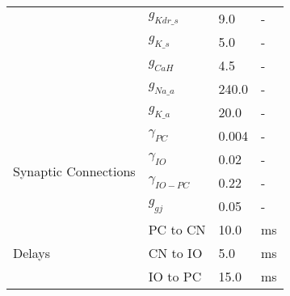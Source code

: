 \begin{table}[h]
\begin{tabular}{llll}
 & $g_{Kdr\_s}$ & 9.0 & - \\
 & $g_{K\_s}$ & 5.0 & - \\
 & $g_{CaH}$ & 4.5 & - \\
 & $g_{Na\_a}$ & 240.0 & - \\
 & $g_{K\_a}$ & 20.0 & - \\
\hline
\multirow{4}{*}{Synaptic Connections} & $\gamma_{PC}$ & 0.004 & - \\
 & $\gamma_{IO}$ & 0.02 & - \\
 & $\gamma_{IO-PC}$ & 0.22 & - \\
 & $g_{gj}$ & 0.05 & - \\
\hline
\multirow{3}{*}{Delays} & PC to CN & 10.0 & ms \\
 & CN to IO & 5.0 & ms \\
 & IO to PC & 15.0 & ms \\
\hline
\end{tabular}
\end{table}
